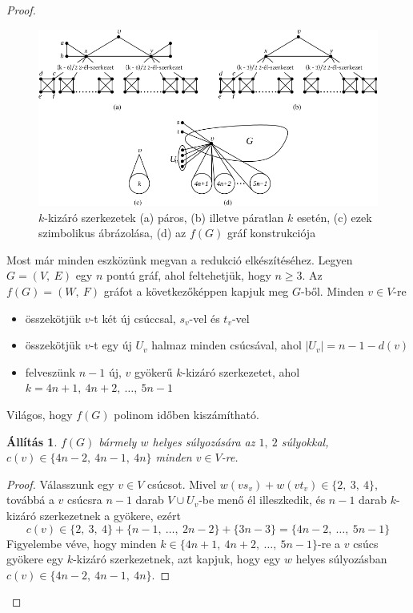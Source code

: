 \documentclass[12pt, a4paper]{report}
\newtheorem{áll}[tét]{Állítás}
\theoremstyle{remark}
\theoremstyle{definition}
\begin{document}
\begin{proof}
\begin{figure}[!h]
\centering
\includegraphics[width=\linewidth]{./images/gadgets12}
\caption{$k$-kizáró szerkezetek (a) páros, (b) illetve páratlan $k$ esetén, (c) ezek szimbolikus ábrázolása, (d) az $f(G)$ gráf konstrukciója}
\label{fig:gadgets12}
\end{figure}

Most már minden eszközünk megvan a redukció elkészítéséhez. Legyen $G = (V,\ E)$ egy $n$ pontú gráf, ahol feltehetjük, hogy $n \geq 3$. Az $f(G) = (W,\ F)$ gráfot a következőképpen kapjuk meg $G$-ből. Minden $v \in V$-re
\begin{itemize}
\item összekötjük $v$-t két új csúccsal, $s_v$-vel és $t_v$-vel
\item összekötjük $v$-t egy új $U_v$ halmaz minden csúcsával, ahol $|U_v| = n - 1 - d(v)$
\item felveszünk $n - 1$ új, $v$ gyökerű $k$-kizáró szerkezetet, ahol $k = 4n + 1,\ 4n + 2,\ \ldots,\ 5n - 1$
\end{itemize}

Világos, hogy $f(G)$ polinom időben kiszámítható.

\begin{áll} \label{pro:npreduct12}
$f(G)$ bármely $w$ helyes súlyozására az $1,\ 2$ súlyokkal, $c(v) \in \lbrace 4n - 2,\ 4n - 1,\ 4n \rbrace$ minden $v \in V$-re.
\end{áll}

\begin{proof}
Válasszunk egy $v \in V$ csúcsot. Mivel $w(vs_v) + w(vt_v) \in \lbrace 2,\ 3,\ 4 \rbrace$, továbbá a $v$ csúcsra $n - 1$ darab $V \cup U_v$-be menő él illeszkedik, és $n - 1$ darab $k$-kizáró szerkezetnek a gyökere, ezért
\begin{equation*}
c(v) \in \lbrace 2,\ 3,\ 4 \rbrace + \lbrace n - 1,\ \ldots,\ 2n - 2 \rbrace + \lbrace 3n - 3 \rbrace = \lbrace 4n - 2,\ \ldots,\ 5n - 1 \rbrace
\end{equation*}
Figyelembe véve, hogy minden $k \in \lbrace 4n + 1,\ 4n + 2,\ \ldots,\ 5n - 1 \rbrace$-re a $v$ csúcs gyökere egy $k$-kizáró szerkezetnek, azt kapjuk, hogy egy $w$ helyes súlyozásban $c(v) \in \lbrace 4n - 2,\ 4n - 1,\ 4n \rbrace$.
\end{proof}


\end{proof}
\end{document}
